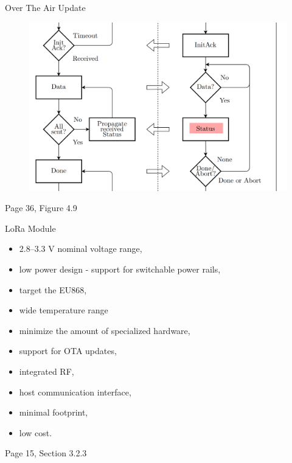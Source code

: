\documentclass{beamer}
\newcommand{\backupend}{
   \addtocounter{framenumberappendix}{-\value{framenumber}}
   \addtocounter{framenumber}{\value{framenumberappendix}} 
}
\begin{document}
\begin{frame}{Over The Air Update}
\begin{figure}
    \centering
    \includegraphics[width=\linewidth]{img/ota.png}
\end{figure}
\begin{flushright}
    Page 36, Figure 4.9
\end{flushright}
\end{frame}


\begin{frame}{LoRa Module}
\begin{itemize}
    \item 2.8--3.3 V nominal voltage range,
    \item low power design - support for switchable power rails,
    \item target the EU868,
    \item wide temperature range
    \item minimize the amount of specialized hardware,
    \item support for OTA updates,
    \item integrated RF,
    \item host communication interface,
    \item minimal footprint,
    \item low cost.
\end{itemize}
\begin{flushright}
    Page 15, Section 3.2.3
\end{flushright}
\end{frame}

\backupend
\end{document}
